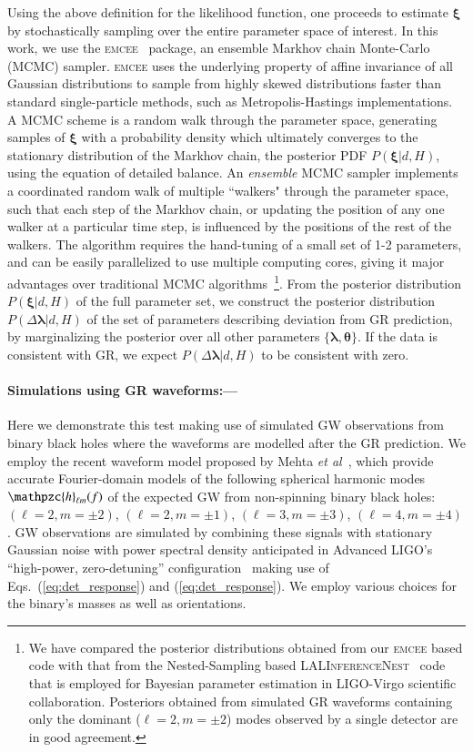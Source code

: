 \documentclass[prl,preprintnumbers,twocolumn,eqsecnum,floatfix,a4paper,nofootinbib,superscriptaddress]{revtex4}
\newcommand{\h}{\mathpzc{h}}
\newcommand{\blambda}{\bm{\lambda}}
\newcommand{\btheta}{\bm{\theta}}
\newcommand{\bxi}{\bm{\xi}}
\newcommand{\etal}{\emph{et al}}
\begin{document}
Using the above definition for the likelihood function, one proceeds to estimate $\bxi$ by stochastically sampling over the entire parameter space of interest. In this work, we use the \textsc{emcee}~\cite{goodman2010ensemble,foreman2013emcee} package, an ensemble Markhov chain Monte-Carlo (MCMC) sampler. \textsc{emcee} uses the underlying property of affine invariance of all Gaussian distributions to sample from highly skewed distributions faster than standard single-particle methods, such as Metropolis-Hastings implementations. A MCMC scheme is a random walk through the parameter space, generating samples of $\bxi$ with a probability density which ultimately converges to the stationary distribution of the Markhov chain, the posterior PDF $P(\bxi|d, H)$, using the equation of detailed balance. An \emph{ensemble} MCMC sampler implements a coordinated random walk of multiple ``walkers" through the parameter space, such that each step of the Markhov chain, or updating the position of any one walker at a particular time step, is influenced by the positions of the rest of the walkers. The algorithm requires the hand-tuning of a small set of 1-2 parameters, and can be easily parallelized to use multiple computing cores, giving it major advantages over traditional MCMC algorithms~\footnote{We have compared the posterior distributions obtained from our \textsc{emcee} based code with that from the Nested-Sampling based \textsc{LALInferenceNest}~\cite{lalinferencenest} code that is employed for Bayesian parameter estimation in LIGO-Virgo scientific collaboration. Posteriors obtained from simulated GR waveforms containing only the dominant ($\ell = 2, m = \pm 2$) modes observed by a single detector are in good agreement.}. From the posterior distribution $P(\bxi | d, H)$ of the full parameter set, we construct the posterior distribution $P(\Delta \blambda | d, H)$ of the set of parameters describing deviation from GR prediction, by marginalizing the posterior over all other parameters $\{\blambda, \btheta\}$. If the data is consistent with GR, we expect $P(\Delta \blambda | d, H)$ to be consistent with zero. 

\paragraph{Simulations using GR waveforms:---}
Here we demonstrate this test making use of simulated GW observations from binary black holes where the waveforms are modelled after the GR prediction. We employ the recent waveform model proposed by Mehta \etal~\cite{Mehta:2017jpq}, which provide accurate Fourier-domain models of the following spherical harmonic modes $\h_{\ell m}(f)$ of the expected GW from non-spinning binary black holes: $(\ell = 2, m = \pm2)$, $(\ell = 2, m=\pm1)$, $(\ell = 3, m=\pm3)$, $(\ell = 4, m = \pm4)$. GW observations are simulated by combining these signals with stationary Gaussian noise with power spectral density anticipated in Advanced LIGO's ``high-power, zero-detuning'' configuration~\cite{aLIGOZeroDetHighPower} making use of Eqs.~(\ref{eq:det_response}) and (\ref{eq:det_response}). We employ various choices for the binary's masses as well as orientations. 
 
\end{document}
